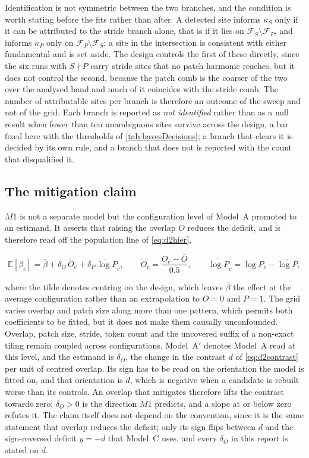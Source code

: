 Identification is not symmetric between the two branches, and the condition is worth stating before the fits rather than after. A detected site informs $\kappa_S$ only if it can be attributed to the stride branch alone, that is if it lies on $\mathcal F_S \setminus \mathcal F_P$, and informs $\kappa_P$ only on $\mathcal F_P \setminus \mathcal F_S$; a site in the intersection is consistent with either fundamental and is set aside. The design controls the first of these directly, since the six runs with $S \nmid P$ carry stride sites that no patch harmonic reaches, but it does not control the second, because the patch comb is the coarser of the two over the analysed band and much of it coincides with the stride comb. The number of attributable sites per branch is therefore an outcome of the sweep and not of the grid. Each branch is reported as \emph{not identified} rather than as a null result when fewer than ten unambiguous sites survive across the design, a bar fixed here with the thresholds of \autoref{tab:bayesDecisions}; a branch that clears it is decided by its own rule, and a branch that does not is reported with the count that disqualified it.

\subsection{The mitigation claim}

$M1$ is not a separate model but the configuration level of Model~A promoted to an estimand. It asserts that raising the overlap $O$ reduces the deficit, and is therefore read off the population line of \autoref{eq:d2hier},

\begin{equation}
\label{eq:d2mitigation}
\mathbb{E}\!\left[\beta_c\right] = \bar\beta + \delta_O\,\widetilde O_c + \delta_P\,\widetilde{\log P}_c,
\qquad
\widetilde O_c=\frac{O_c-\bar O}{0.5},
\qquad
\widetilde{\log P}_c=\log P_c-\overline{\log P},
\end{equation}

where the tilde denotes centring on the design, which leaves $\bar\beta$ the effect at the average configuration rather than an extrapolation to $O=0$ and $P=1$. The grid varies overlap and patch size along more than one pattern, which permits both coefficients to be fitted, but it does not make them causally unconfounded. Overlap, patch size, stride, token count and the uncovered suffix of a non-exact tiling remain coupled across configurations. Model~A$'$ denotes Model~A read at this level, and the estimand is $\delta_O$, the change in the contrast $d$ of \autoref{eq:d2contrast} per unit of centred overlap. Its sign has to be read on the orientation the model is fitted on, and that orientation is $d$, which is negative when a candidate is rebuilt worse than its controls. An overlap that mitigates therefore lifts the contrast towards zero: $\delta_O>0$ is the direction $M1$ predicts, and a slope at or below zero refutes it. The claim itself does not depend on the convention, since it is the same statement that overlap reduces the deficit; only its sign flips between $d$ and the sign-reversed deficit $y=-d$ that Model~C uses, and every $\delta_O$ in this report is stated on $d$.

